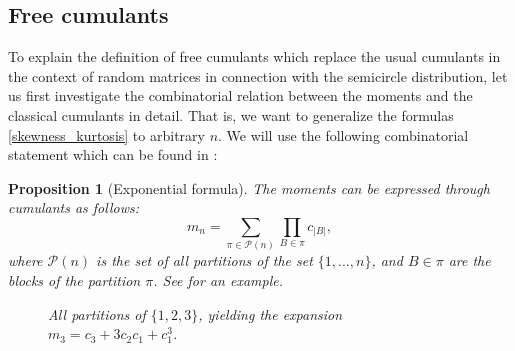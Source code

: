 \documentclass[letterpaper,11pt,oneside,reqno]{amsart}
\numberwithin{equation}{section}
\newtheorem{proposition}{Proposition}[section]
\theoremstyle{definition}
\begin{document}

\subsection{Free cumulants} %
\label{sub:free_cumulants}

To explain the definition of free cumulants which replace the usual
cumulants in the context of random matrices in connection with the semicircle
distribution, let us first investigate the combinatorial relation between the 
moments and the classical cumulants in detail. That is, we 
want to generalize the formulas \eqref{skewness_kurtosis} to arbitrary $n$.
We will use the following combinatorial statement which can be found in 
\cite[Section 5.1]{Stanley1999}:
\begin{proposition}[Exponential formula]\label{prop:expon_thm}
	The moments can be expressed through cumulants as follows:
	\begin{equation}\label{moments_via_cumulants}
	     m_n=\sum_{\pi\in\mathcal{P}(n)} \prod_{B\in\pi} c_{|B|},
	\end{equation}
	where $\mathcal{P}(n)$ is the set of all partitions of the set 
	$\{1,...,n\}$, and $B\in \pi$ are the blocks of the partition $\pi$.
	See  for an example.
	\begin{figure}[htbp]
		\caption{All partitions of $\{1,2,3\}$, yielding the 
		expansion $m_3=c_3+3c_2c_1+c_1^{3}$.}
		\label{fig:partition}
	\end{figure}
\end{proposition}
\end{document}
